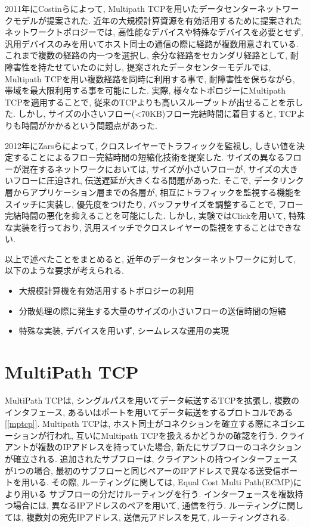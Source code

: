 \documentclass{ieicej}
\begin{document}
2011年にCostinらによって, Multipath TCPを用いたデータセンターネットワークモデルが提案された.
近年の大規模計算資源を有効活用するために提案されたネットワークトポロジーでは,
高性能なデバイスや特殊なデバイスを必要とせず, 汎用デバイスのみを用いてホスト同士の通信の際に経路が複数用意されている.
これまで複数の経路の内一つを選択し, 余分な経路をセカンダリ経路として, 耐障害性を持たせていたのに対し, 提案されたデータセンターモデルでは,
Multipath TCPを用い複数経路を同時に利用する事で, 耐障害性を保ちながら, 帯域を最大限利用する事を可能にした.
実際, 様々なトポロジーにMultipath TCPを適用することで, 従来のTCPよりも高いスループットが出せることを示した.
しかし, サイズの小さいフロー(<70KB)フロー完結時間に着目すると, TCPよりも時間がかかるという問題点があった.

2012年にZarsらによって, クロスレイヤーでトラフィックを監視し, しきい値を決定することによるフロー完結時間の短縮化技術を提案した.
サイズの異なるフローが混在するネットワークにおいては, サイズが小さいフローが, サイズの大きいフローに圧迫され, 伝送遅延が大きくなる問題があった.
そこで, データリンク層からアプリケーション層までの各層が, 相互にトラフィックを監視する機能をスイッチに実装し, 優先度をつけたり,
バッファサイズを調整することで, フロー完結時間の悪化を抑えることを可能にした.
しかし, 実験ではClick\cite{}を用いて, 特殊な実装を行っており, 汎用スイッチでクロスレイヤーの監視をすることはできない.

以上で述べたことをまとめると, 近年のデータセンターネットワークに対して, 以下のような要求が考えられる.
\begin{itemize}
  \item 大規模計算機を有効活用するトポロジーの利用
  \item 分散処理の際に発生する大量のサイズの小さいフローの送信時間の短縮
  \item 特殊な実装, デバイスを用いず, シームレスな運用の実現
\end{itemize}

\section{MultiPath TCP}
MultiPath TCPは, シングルパスを用いてデータ転送するTCPを拡張し, 複数のインタフェース,
あるいはポートを用いてデータ転送をするプロトコルである[\ref{mptcp}].
Multipath TCPは, ホスト同士がコネクションを確立する際にネゴシエーションが行われ, 互いにMultipath TCPを扱えるかどうかの確認を行う.
クライアントが複数のIPアドレスを持っていた場合, 新たにサブフローのコネクションが確立される.
追加されたサブフローは, クライアントの持つインターフェースが1つの場合, 最初のサブフローと同じペアーのIPアドレスで異なる送受信ポートを用いる.
その際, ルーティングに関しては, Equal Cost Multi Path(ECMP)により用いる
サブフローの分だけルーティングを行う.
インターフェースを複数持つ場合には, 異なるIPアドレスのペアを用いて, 通信を行う.
ルーティングに関しては, 複数対の宛先IPアドレス, 送信元アドレスを見て, ルーティングされる.
\end{document}
